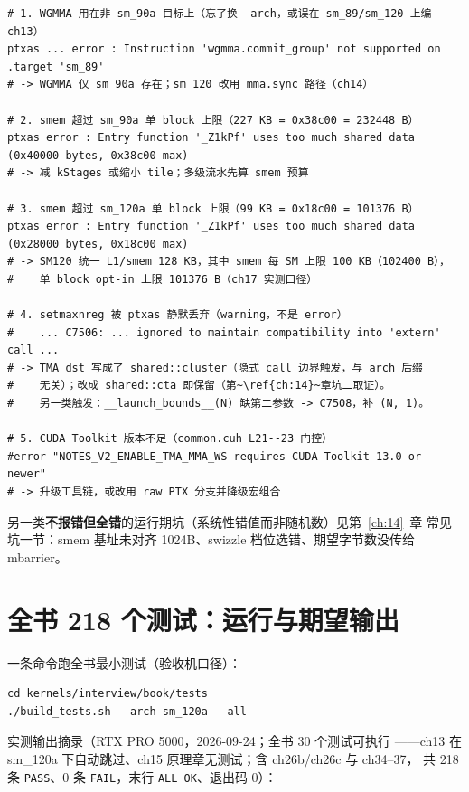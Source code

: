 \begin{lstlisting}[style=console]
# 1. WGMMA 用在非 sm_90a 目标上（忘了换 -arch，或误在 sm_89/sm_120 上编 ch13）
ptxas ... error : Instruction 'wgmma.commit_group' not supported on .target 'sm_89'
# -> WGMMA 仅 sm_90a 存在；sm_120 改用 mma.sync 路径（ch14）

# 2. smem 超过 sm_90a 单 block 上限（227 KB = 0x38c00 = 232448 B）
ptxas error : Entry function '_Z1kPf' uses too much shared data (0x40000 bytes, 0x38c00 max)
# -> 减 kStages 或缩小 tile；多级流水先算 smem 预算

# 3. smem 超过 sm_120a 单 block 上限（99 KB = 0x18c00 = 101376 B）
ptxas error : Entry function '_Z1kPf' uses too much shared data (0x28000 bytes, 0x18c00 max)
# -> SM120 统一 L1/smem 128 KB，其中 smem 每 SM 上限 100 KB（102400 B），
#    单 block opt-in 上限 101376 B（ch17 实测口径）

# 4. setmaxnreg 被 ptxas 静默丢弃（warning，不是 error）
#    ... C7506: ... ignored to maintain compatibility into 'extern' call ...
# -> TMA dst 写成了 shared::cluster（隐式 call 边界触发，与 arch 后缀
#    无关）；改成 shared::cta 即保留（第~\ref{ch:14}~章坑二取证）。
#    另一类触发：__launch_bounds__(N) 缺第二参数 -> C7508，补 (N, 1)。

# 5. CUDA Toolkit 版本不足（common.cuh L21--23 门控）
#error "NOTES_V2_ENABLE_TMA_MMA_WS requires CUDA Toolkit 13.0 or newer"
# -> 升级工具链，或改用 raw PTX 分支并降级宏组合
\end{lstlisting}

另一类\textbf{不报错但全错}的运行期坑（系统性错值而非随机数）见第~\ref{ch:14}~章
常见坑一节：smem 基址未对齐 1024B、swizzle 档位选错、期望字节数没传给
mbarrier。

\section{全书 218 个测试：运行与期望输出}

一条命令跑全书最小测试（验收机口径）：

\begin{lstlisting}[style=console]
cd kernels/interview/book/tests
./build_tests.sh --arch sm_120a --all
\end{lstlisting}

\noindent 实测输出摘录（RTX PRO 5000，2026-09-24；全书 30 个测试可执行
——ch13 在 sm\_120a 下自动跳过、ch15 原理章无测试；含 ch26b/ch26c 与 ch34--37，
共 218 条 \texttt{PASS}、0 条 \texttt{FAIL}，末行 \texttt{ALL~OK}、退出码 0）：

